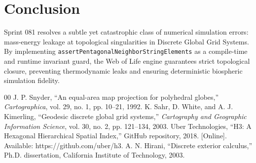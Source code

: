 \documentclass[10pt,journal,compsoc]{IEEEtran}
\begin{document}
\section{Conclusion}
Sprint 081 resolves a subtle yet catastrophic class of numerical simulation errors: mass-energy leakage at topological singularities in Discrete Global Grid Systems. By implementing \texttt{assertPentagonalNeighborStringElements} as a compile-time and runtime invariant guard, the Web of Life engine guarantees strict topological closure, preventing thermodynamic leaks and ensuring deterministic biospheric simulation fidelity.

\begin{thebibliography}{00}
 J. P. Snyder, ``An equal-area map projection for polyhedral globes,'' \emph{Cartographica}, vol. 29, no. 1, pp. 10--21, 1992.
 K. Sahr, D. White, and A. J. Kimerling, ``Geodesic discrete global grid systems,'' \emph{Cartography and Geographic Information Science}, vol. 30, no. 2, pp. 121--134, 2003.
 Uber Technologies, ``H3: A Hexagonal Hierarchical Spatial Index,'' GitHub repository, 2018. [Online]. Available: https://github.com/uber/h3.
 A. N. Hirani, ``Discrete exterior calculus,'' Ph.D. dissertation, California Institute of Technology, 2003.
\end{thebibliography}
\end{document}
